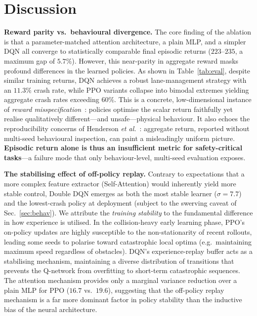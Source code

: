\documentclass[conference]{IEEEtran}
\begin{document}
\section{Discussion}
\label{sec:discussion}

\textbf{Reward parity vs.\ behavioural divergence.} The core finding of the
ablation is that a parameter-matched attention architecture, a plain MLP, and a
simpler DQN all converge to statistically comparable final episodic returns
($223$--$235$, a maximum gap of $5.7\%$). However, this near-parity in
aggregate reward masks profound differences in the learned policies. As shown in
Table~\ref{tab:eval}, despite similar training returns, DQN achieves a robust
lane-management strategy with an $11.3\%$ crash rate, while PPO variants
collapse into bimodal extremes yielding aggregate crash rates exceeding $60\%$.
This is a concrete, low-dimensional instance of \emph{reward
misspecification}~\cite{amodei2016concrete, pan2022effects}: policies optimise
the scalar return faithfully yet realise qualitatively different---and unsafe---physical
behaviour. It also echoes the reproducibility concerns of Henderson
\emph{et al.}~\cite{henderson2018deep}: aggregate return, reported without
multi-seed behavioural inspection, can paint a misleadingly uniform picture.
\textbf{Episodic return alone is thus an insufficient metric for safety-critical
tasks}---a failure mode that only behaviour-level, multi-seed evaluation exposes.

\textbf{The stabilising effect of off-policy replay.} Contrary to expectations
that a more complex feature extractor (Self-Attention) would inherently yield
more stable control, Double DQN emerges as both the most stable learner
($\sigma=7.7$) and the lowest-crash policy at deployment (subject to the swerving
caveat of Sec.~\ref{sec:behav}). We attribute the \emph{training stability} to the
fundamental difference in how experience is utilised. In the collision-heavy
early learning phase, PPO's on-policy updates are highly susceptible to the
non-stationarity of recent rollouts, leading some seeds to polarise toward
catastrophic local optima (e.g.\ maintaining maximum speed regardless of
obstacles). DQN's experience-replay buffer acts as a stabilising mechanism,
maintaining a diverse distribution of transitions that prevents the Q-network
from overfitting to short-term catastrophic sequences. The attention mechanism
provides only a marginal variance reduction over a plain MLP for PPO
($16.7$ vs.\ $19.6$), suggesting that the off-policy replay mechanism is a far
more dominant factor in policy stability than the inductive bias of the neural
architecture.
\end{document}
